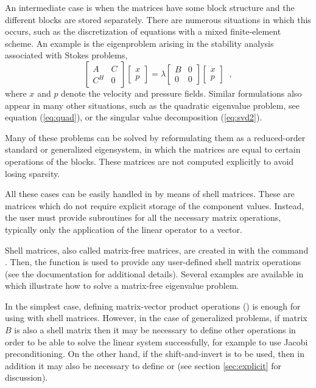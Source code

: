 	An intermediate case is when the matrices have some block structure and the different blocks are stored separately. There are numerous situations in which this occurs, such as the discretization of equations with a mixed finite-element scheme. An example is the eigenproblem arising in the stability analysis associated with Stokes problems,
\begin{equation}
\left[\begin{array}{cc}A & C\\C^H & 0\end{array}\right]\left[\begin{array}{c}x\\p\end{array}\right]
=\lambda\left[\begin{array}{cc}B & 0\\0 & 0\end{array}\right]\left[\begin{array}{c}x\\p\end{array}\right]\;\;,
\end{equation}
where $x$ and $p$ denote the velocity and pressure fields. Similar formulations also appear in many other situations, such as the quadratic eigenvalue problem, see equation (\ref{eq:quad}), or the singular value decomposition (\ref{eq:svd2}).

	Many of these problems can be solved by reformulating them as a reduced-order standard or generalized eigensystem, in which the matrices are equal to certain operations of the blocks. These matrices are not computed explicitly to avoid losing sparsity.

	All these cases can be easily handled in \slepc by means of shell matrices. These are matrices which do not require explicit storage of the component values. Instead, the user must provide subroutines for all the necessary matrix operations, typically only the application of the linear operator to a vector. 

	Shell matrices, also called matrix-free matrices, are created in \petsc{} with the command . Then, the function  is used to provide any user-defined shell matrix operations (see the \petsc{} documentation for additional details). Several examples are available in \slepc which illustrate how to solve a matrix-free eigenvalue problem.

	In the simplest case, defining matrix-vector product operations () is enough for using  with shell matrices. However, in the case of generalized problems, if matrix $B$ is also a shell matrix then it may be necessary to define other operations in order to be able to solve the linear system successfully, for example  to use Jacobi preconditioning. On the other hand, if the shift-and-invert  is to be used, then in addition it may also be necessary to define  or  (see section \ref{sec:explicit} for discussion).

